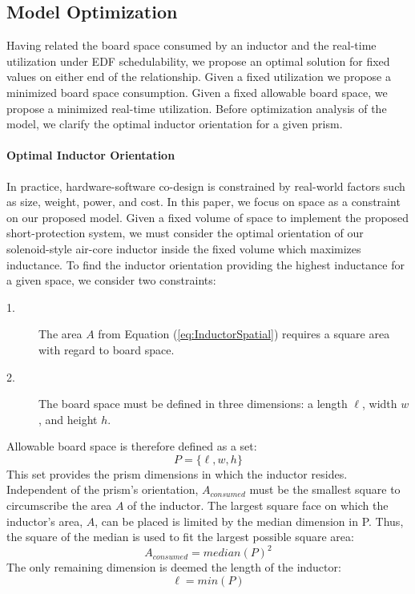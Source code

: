 \clearpage \subsection{Model Optimization}\label{subsec:model optimization}
Having related the board space consumed by an inductor and the real-time utilization under EDF schedulability, we propose an optimal solution for fixed values on either end of the relationship.
Given a fixed utilization we propose a minimized board space consumption.
Given a fixed allowable board space, we propose a minimized real-time utilization.
Before optimization analysis of the model, we clarify the optimal inductor orientation for a given prism.

\paragraph{Optimal Inductor Orientation}
In practice, hardware-software co-design is constrained by real-world factors such as size, weight, power, and cost.
In this paper, we focus on space as a constraint on our proposed model.
Given a fixed volume of space to implement the proposed short-protection system, we must consider the optimal orientation of our solenoid-style air-core inductor inside the fixed volume which maximizes inductance.
To find the inductor orientation providing the highest inductance for a given space, we consider two constraints:
\begin{description}
\item [1.] The area $A$ from Equation (\ref{eq:InductorSpatial}) requires a square area with regard to board space.
\item [2.] The board space must be defined in three dimensions: a length $\ell$, width $w$, and height $h$.
\end{description}
Allowable board space is therefore defined as a set:
\begin{equation}\label{eq:Prism}
P = \{\ell,w,h\}
\end{equation}
This set provides the prism dimensions in which the inductor resides.
Independent of the prism's orientation, $A_{consumed}$ must be the smallest square to circumscribe the area $A$ of the inductor.
The largest square face on which the inductor's area, $A$, can be placed is limited by the median dimension in P.
Thus, the square of the median is used to fit the largest possible square area:
\begin{equation}\label{eq:PrismAreaConsumed}
A_{consumed} = median(P)^2
\end{equation}
The only remaining dimension is deemed the length of the inductor:
\begin{equation}\label{eq:PrismLength}
\ell = min(P)
\end{equation}

